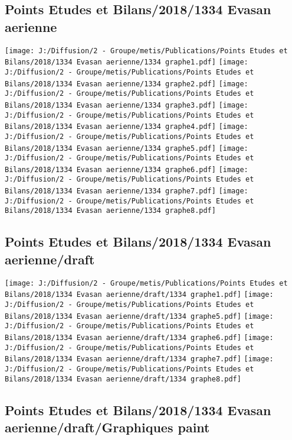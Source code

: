 \documentclass[
]{article}
\begin{document}
\hypertarget{points-etudes-et-bilans20181334-evasan-aerienne}{%
\subsection{Points Etudes et Bilans/2018/1334 Evasan
aerienne}\label{points-etudes-et-bilans20181334-evasan-aerienne}}

\texttt{[image: J:/Diffusion/2 - Groupe/metis/Publications/Points Etudes et Bilans/2018/1334 Evasan aerienne/1334 graphe1.pdf]}
\texttt{[image: J:/Diffusion/2 - Groupe/metis/Publications/Points Etudes et Bilans/2018/1334 Evasan aerienne/1334 graphe2.pdf]}
\texttt{[image: J:/Diffusion/2 - Groupe/metis/Publications/Points Etudes et Bilans/2018/1334 Evasan aerienne/1334 graphe3.pdf]}
\texttt{[image: J:/Diffusion/2 - Groupe/metis/Publications/Points Etudes et Bilans/2018/1334 Evasan aerienne/1334 graphe4.pdf]}
\texttt{[image: J:/Diffusion/2 - Groupe/metis/Publications/Points Etudes et Bilans/2018/1334 Evasan aerienne/1334 graphe5.pdf]}
\texttt{[image: J:/Diffusion/2 - Groupe/metis/Publications/Points Etudes et Bilans/2018/1334 Evasan aerienne/1334 graphe6.pdf]}
\texttt{[image: J:/Diffusion/2 - Groupe/metis/Publications/Points Etudes et Bilans/2018/1334 Evasan aerienne/1334 graphe7.pdf]}
\texttt{[image: J:/Diffusion/2 - Groupe/metis/Publications/Points Etudes et Bilans/2018/1334 Evasan aerienne/1334 graphe8.pdf]}

\hypertarget{points-etudes-et-bilans20181334-evasan-aeriennedraft}{%
\subsection{Points Etudes et Bilans/2018/1334 Evasan
aerienne/draft}\label{points-etudes-et-bilans20181334-evasan-aeriennedraft}}

\texttt{[image: J:/Diffusion/2 - Groupe/metis/Publications/Points Etudes et Bilans/2018/1334 Evasan aerienne/draft/1334 graphe1.pdf]}
\texttt{[image: J:/Diffusion/2 - Groupe/metis/Publications/Points Etudes et Bilans/2018/1334 Evasan aerienne/draft/1334 graphe5.pdf]}
\texttt{[image: J:/Diffusion/2 - Groupe/metis/Publications/Points Etudes et Bilans/2018/1334 Evasan aerienne/draft/1334 graphe6.pdf]}
\texttt{[image: J:/Diffusion/2 - Groupe/metis/Publications/Points Etudes et Bilans/2018/1334 Evasan aerienne/draft/1334 graphe7.pdf]}
\texttt{[image: J:/Diffusion/2 - Groupe/metis/Publications/Points Etudes et Bilans/2018/1334 Evasan aerienne/draft/1334 graphe8.pdf]}

\hypertarget{points-etudes-et-bilans20181334-evasan-aeriennedraftgraphiques-paint}{%
\subsection{Points Etudes et Bilans/2018/1334 Evasan
aerienne/draft/Graphiques
paint}\label{points-etudes-et-bilans20181334-evasan-aeriennedraftgraphiques-paint}}
\end{document}
